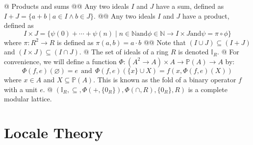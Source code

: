 \documentclass[]{article}
\newcommand{\mbb}[1]{\ensuremath{\mathbb{#1}}}     %
\newcommand{\rmand}{\ensuremath{\mathrel{\mathrm{and}}}}
\newcommand{\comp}[0]{\circ}
\newcommand{\define}[1]{\textsf{#1}}
\begin{document}
\begin{easylist}[enumerate]
{}
@ Products and sums
@@ {%
  Any two ideals $I$ and $J$ have a sum, defined as
  $I + J = \{a + b \mid a \in I \land b \in J\}$.
}
@@ {%
  Any two ideals $I$ and $J$ have a product, defined as
  \begin{equation*}
  I \times J = \{
    \psi(0) + \cdots + \psi(n)
    \mid   n \in \mbb{N}
    \rmand \phi \in \mbb{N} \to I \times J
    \rmand \psi = \pi \comp \phi
  \}
  \end{equation*}
  where $\pi : R^2 \to R$ is defined as $\pi(a, b) = a \cdot b$
}
@@ {%
  Note that $(I \cup J) \subseteq (I + J)$
  and $(I \times J) \subseteq (I \cap J)$.
}
@ The set of ideals of a ring $R$ is denoted $\mbb{I}_R$.
@ {%
  For convenience, we will define a function
  $\Phi : (A^2 \to A) \times A \to \mbb{P}(A) \to A$ by:
  \begin{equation*}
    {\Phi(f, e)(\varnothing) = e}
    ~ ~ \rmand ~ ~
    {\Phi(f, e)(\{x\} \cup X) = f(x, \Phi(f, e)(X))}
  \end{equation*}
  where $x \in A$ and $X \subseteq \mbb{P}(A)$.
  This is known as the \define{fold} of a binary operator $f$ with a unit $e$.
}
@ {%
  $(\mbb{I}_R, \subseteq, \Phi(+, \{0_R\}), \Phi(\cap, R), \{0_R\}, R)$
  is a complete modular lattice.
}
\end{easylist}

\section{Locale Theory}
\end{document}

